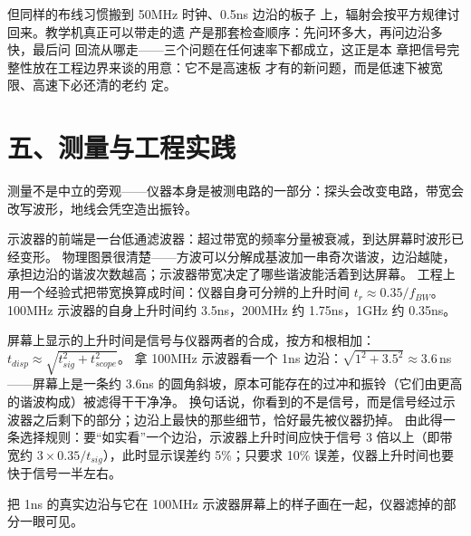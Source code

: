 但同样的布线习惯搬到 50MHz 时钟、0.5ns 边沿的板子
上，辐射会按平方规律讨回来。教学机真正可以带走的遗
产是那套检查顺序：先问环多大，再问边沿多快，最后问
回流从哪走——三个问题在任何速率下都成立，这正是本
章把信号完整性放在工程边界来谈的用意：它不是高速板
才有的新问题，而是低速下被宽限、高速下必还清的老约
定。

\section{五、测量与工程实践}

测量不是中立的旁观——仪器本身是被测电路的一部分：探头会改变电路，带宽会改写波形，地线会凭空造出振铃。

示波器的前端是一台低通滤波器：超过带宽的频率分量被衰减，到达屏幕时波形已经变形。
物理图景很清楚——方波可以分解成基波加一串奇次谐波，边沿越陡，承担边沿的谐波次数越高；示波器带宽决定了哪些谐波能活着到达屏幕。
工程上用一个经验式把带宽换算成时间：仪器自身可分辨的上升时间 $t_r \approx 0.35 / f_{BW}$。
100MHz 示波器的自身上升时间约 3.5ns，200MHz 约 1.75ns，1GHz 约 0.35ns。

屏幕上显示的上升时间是信号与仪器两者的合成，按方和根相加：$t_{disp} \approx \sqrt{t_{sig}^2 + t_{scope}^2}$。
拿 100MHz 示波器看一个 1ns 边沿：$\sqrt{1^2 + 3.5^2} \approx 3.6$\,ns——屏幕上是一条约 3.6ns 的圆角斜坡，原本可能存在的过冲和振铃（它们由更高的谐波构成）被滤得干干净净。
换句话说，你看到的不是信号，而是信号经过示波器之后剩下的部分；边沿上最快的那些细节，恰好最先被仪器扔掉。
由此得一条选择规则：要“如实看”一个边沿，示波器上升时间应快于信号 3 倍以上（即带宽约 $3 \times 0.35/t_{sig}$），此时显示误差约 5\%；只要求 10\% 误差，仪器上升时间也要快于信号一半左右。

把 1ns 的真实边沿与它在 100MHz 示波器屏幕上的样子画在一起，仪器滤掉的部分一眼可见。


